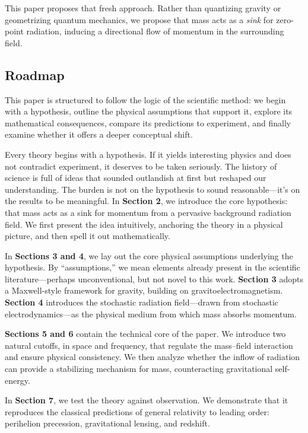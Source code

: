 \documentclass {article}
\begin{document}
This paper proposes that fresh approach. Rather than quantizing gravity or geometrizing quantum mechanics, we propose that mass acts as a \emph{sink} for zero-point radiation, inducing a directional flow of momentum in the surrounding field. 

\subsection{Roadmap}

This paper is structured to follow the logic of the scientific method: we begin with a hypothesis, outline the physical assumptions that support it, explore its mathematical consequences, compare its predictions to experiment, and finally examine whether it offers a deeper conceptual shift.

Every theory begins with a hypothesis. If it yields interesting physics and does not contradict experiment, it deserves to be taken seriously. The history of science is full of ideas that sounded outlandish at first but reshaped our understanding. The burden is not on the hypothesis to sound reasonable—it’s on the results to be meaningful. In \textbf{Section 2}, we introduce the core hypothesis: that mass acts as a sink for momentum from a pervasive background radiation field. We first present the idea intuitively, anchoring the theory in a physical picture, and then spell it out mathematically.

In \textbf{Sections 3 and 4}, we lay out the core physical assumptions underlying the hypothesis. By “assumptions,” we mean elements already present in the scientific literature—perhaps unconventional, but not novel to this work. \textbf{Section 3} adopts a Maxwell-style framework for gravity, building on gravitoelectromagnetism. \textbf{Section 4} introduces the stochastic radiation field—drawn from stochastic electrodynamics—as the physical medium from which mass absorbs momentum.

\textbf{Sections 5 and 6} contain the technical core of the paper. We introduce two natural cutoffs, in space and frequency, that regulate the mass–field interaction and ensure physical consistency. We then analyze whether the inflow of radiation can provide a stabilizing mechanism for mass, counteracting gravitational self-energy.

In \textbf{Section 7}, we test the theory against observation. We demonstrate that it reproduces the classical predictions of general relativity to leading order: perihelion precession, gravitational lensing, and redshift.
\end{document}
